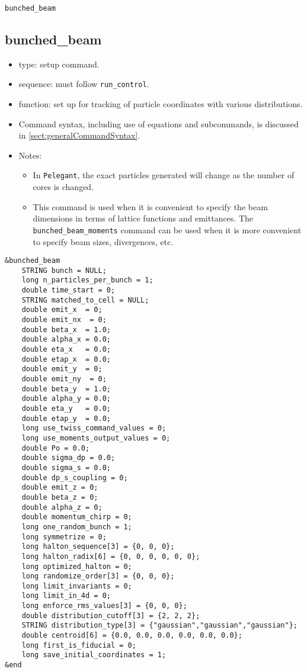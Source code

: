 \documentclass[11pt]{article}
\begin{document}
\newpage
\begin{center}{\Large\verb|bunched_beam|}\end{center}
\subsection{bunched\_beam \label{subsec:bunchedbeam}}

\begin{itemize}
\item type: setup command.
\item sequence: must follow \verb|run_control|.
\item function: set up for tracking of particle coordinates with various distributions.
\item Command syntax, including use of equations and subcommands, is discussed in \ref{sect:generalCommandSyntax}.
\item Notes:
  \begin{itemize}
  \item In \verb|Pelegant|, the exact particles generated will change as the number of cores is changed.
  \item This command is used when it is convenient to specify the beam dimensions in terms of lattice functions
    and emittances. The \verb|bunched_beam_moments| command can be used when it is more convenient to specify
    beam sizes, divergences, etc.
  \end{itemize}
\end{itemize}

\begin{verbatim}
&bunched_beam
    STRING bunch = NULL;
    long n_particles_per_bunch = 1;
    double time_start = 0;
    STRING matched_to_cell = NULL;
    double emit_x  = 0;
    double emit_nx  = 0;
    double beta_x  = 1.0;
    double alpha_x = 0.0;
    double eta_x   = 0.0;
    double etap_x  = 0.0;
    double emit_y  = 0;
    double emit_ny  = 0;
    double beta_y  = 1.0;
    double alpha_y = 0.0;
    double eta_y   = 0.0;
    double etap_y  = 0.0;
    long use_twiss_command_values = 0;
    long use_moments_output_values = 0;
    double Po = 0.0;
    double sigma_dp = 0.0;
    double sigma_s = 0.0;
    double dp_s_coupling = 0;
    double emit_z = 0;
    double beta_z = 0;
    double alpha_z = 0;
    double momentum_chirp = 0;
    long one_random_bunch = 1;
    long symmetrize = 0;
    long halton_sequence[3] = {0, 0, 0};
    long halton_radix[6] = {0, 0, 0, 0, 0, 0};
    long optimized_halton = 0;
    long randomize_order[3] = {0, 0, 0};
    long limit_invariants = 0;
    long limit_in_4d = 0;
    long enforce_rms_values[3] = {0, 0, 0};
    double distribution_cutoff[3] = {2, 2, 2};
    STRING distribution_type[3] = {"gaussian","gaussian","gaussian"};
    double centroid[6] = {0.0, 0.0, 0.0, 0.0, 0.0, 0.0};
    long first_is_fiducial = 0;
    long save_initial_coordinates = 1;
&end
\end{verbatim}
\end{document}
